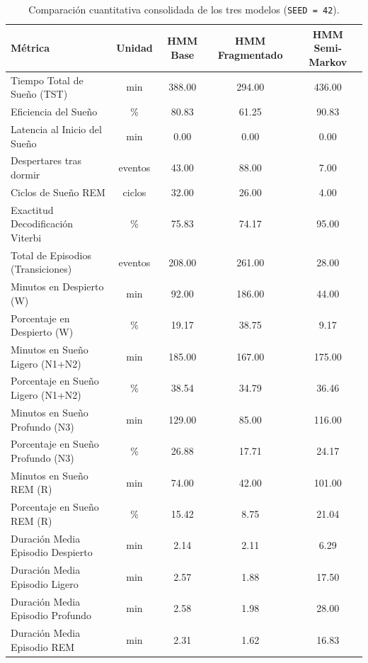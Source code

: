 \documentclass[11pt,a4paper]{article}
\begin{document}
\begin{table}[htbp]
\centering
\footnotesize
\caption{Comparación cuantitativa consolidada de los tres modelos (\texttt{SEED = 42}).}
\label{tab:comparacion_tres}
\renewcommand{\arraystretch}{0.92}
\setlength{\tabcolsep}{4pt}
\begin{tabularx}{\textwidth}{>{\raggedright\arraybackslash}X c c c c}
\toprule
\textbf{Métrica} & \textbf{Unidad} & \textbf{HMM Base} & \textbf{HMM Fragmentado} & \textbf{HMM Semi-Markov} \\
\midrule
Tiempo Total de Sueño (TST) & min & 388.00 & 294.00 & 436.00 \\
Eficiencia del Sueño & \% & 80.83 & 61.25 & 90.83 \\
Latencia al Inicio del Sueño & min & 0.00 & 0.00 & 0.00 \\
Despertares tras dormir & eventos & 43.00 & 88.00 & 7.00 \\
Ciclos de Sueño REM & ciclos & 32.00 & 26.00 & 4.00 \\
Exactitud Decodificación Viterbi & \% & 75.83 & 74.17 & 95.00 \\
Total de Episodios (Transiciones) & eventos & 208.00 & 261.00 & 28.00 \\
Minutos en Despierto (W) & min & 92.00 & 186.00 & 44.00 \\
Porcentaje en Despierto (W) & \% & 19.17 & 38.75 & 9.17 \\
Minutos en Sueño Ligero (N1+N2) & min & 185.00 & 167.00 & 175.00 \\
Porcentaje en Sueño Ligero (N1+N2) & \% & 38.54 & 34.79 & 36.46 \\
Minutos en Sueño Profundo (N3) & min & 129.00 & 85.00 & 116.00 \\
Porcentaje en Sueño Profundo (N3) & \% & 26.88 & 17.71 & 24.17 \\
Minutos en Sueño REM (R) & min & 74.00 & 42.00 & 101.00 \\
Porcentaje en Sueño REM (R) & \% & 15.42 & 8.75 & 21.04 \\
Duración Media Episodio Despierto & min & 2.14 & 2.11 & 6.29 \\
Duración Media Episodio Ligero & min & 2.57 & 1.88 & 17.50 \\
Duración Media Episodio Profundo & min & 2.58 & 1.98 & 28.00 \\
Duración Media Episodio REM & min & 2.31 & 1.62 & 16.83 \\
\bottomrule
\end{tabularx}
\end{table}
\end{document}
